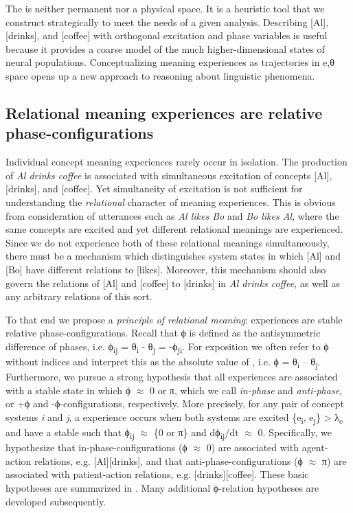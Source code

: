   The  is neither permanent nor a physical space. It is a heuristic tool that we construct strategically to meet the needs of a given analysis. Describing [Al], [drinks], and [coffee] with orthogonal excitation and phase variables is useful because it provides a coarse model of the much higher-di\-men\-sional states of neural populations. Conceptualizing meaning experiences as trajectories in e,θ space opens up a new approach to reasoning about linguistic phenomena.

\subsection{Relational meaning experiences are relative phase-configurations}

Individual concept meaning experiences rarely occur in isolation. The production of \textit{Al drinks coffee} is associated with simultaneous excitation of concepts [Al], [drinks], and [coffee]. Yet simultaneity of excitation is not sufficient for understanding the \textit{relational} character of meaning experiences. This is obvious from consideration of utterances such as \textit{Al likes Bo} and \textit{Bo likes Al}, where the same concepts are excited and yet different relational meanings are experienced. Since we do not experience both of these relational meanings simultaneously, there must be a mechanism which distinguishes system states in which [Al] and [Bo] have different relations to [likes]. Moreover, this mechanism should also govern the relations of [Al] and [coffee] to [drinks] in \textit{Al drinks coffee}, as well as any arbitrary relations of this sort. 

  To that end we propose a \textit{principle of relational meaning}:  experiences are stable relative phase-configurations. Recall that  ϕ is defined as the antisymmetric difference of phases, i.e. ϕ\textsubscript{ij} = θ\textsubscript{i} - θ\textsubscript{j} = -ϕ\textsubscript{ji}. For exposition we often refer to ϕ without indices and interpret this as the absolute value of , i.e. {\textbar}ϕ{\textbar} = {\textbar}θ\textsubscript{i} – θ\textsubscript{j}{\textbar}. Furthermore, we pursue a strong hypothesis that all  experiences are associated with a stable state in which ϕ ${\approx}$ 0 or π, which we call \textit{in-phase} and \textit{anti-phase}, or +ϕ and -ϕ-configurations, respectively. More precisely, for any pair of concept systems \textit{i} and \textit{j}, a  experience occurs when both systems are excited \{e\textsubscript{i}, e\textsubscript{j}\} > λ\textsubscript{e} and have a stable  such that {\textbar}ϕ\textsubscript{ij}{\textbar} ${\approx}$ \{0 or π\} and dϕ\textsubscript{ij}/dt ${\approx}$ 0. Specifically, we hypothesize that in-phase-configurations (ϕ ${\approx}$ 0) are associated with agent-action relations, e.g. [Al][drinks], and that anti-phase-configurations (ϕ ${\approx}$ π) are associated with patient-action relations, e.g. [drinks][coffee]. These basic hypotheses are summarized in {}. Many additional ϕ-relation hypotheses are developed subsequently.

